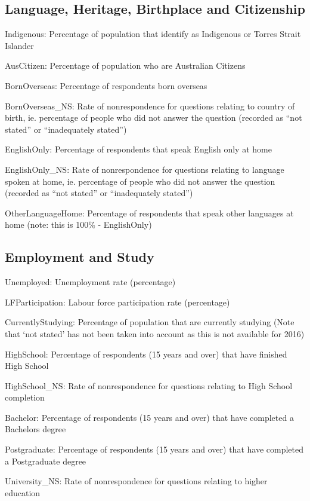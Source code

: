 \documentclass{monashthesis}
\theoremstyle{definition}
\theoremstyle{definition}
\theoremstyle{definition}
\theoremstyle{remark}
\begin{document}
\subsection{Language, Heritage, Birthplace and
Citizenship}\label{language-heritage-birthplace-and-citizenship}

Indigenous: Percentage of population that identify as Indigenous or
Torres Strait Islander

AusCitizen: Percentage of population who are Australian Citizens

BornOverseas: Percentage of respondents born overseas

BornOverseas\_NS: Rate of nonrespondence for questions relating to
country of birth, ie. percentage of people who did not answer the
question (recorded as ``not stated'' or ``inadequately stated'')

EnglishOnly: Percentage of respondents that speak English only at home

EnglishOnly\_NS: Rate of nonrespondence for questions relating to
language spoken at home, ie. percentage of people who did not answer the
question (recorded as ``not stated'' or ``inadequately stated'')

OtherLanguageHome: Percentage of respondents that speak other languages
at home (note: this is 100\% - EnglishOnly)

\subsection{Employment and Study}\label{employment-and-study}

Unemployed: Unemployment rate (percentage)

LFParticipation: Labour force participation rate (percentage)

CurrentlyStudying: Percentage of population that are currently studying
(Note that `not stated' has not been taken into account as this is not
available for 2016)

HighSchool: Percentage of respondents (15 years and over) that have
finished High School

HighSchool\_NS: Rate of nonrespondence for questions relating to High
School completion

Bachelor: Percentage of respondents (15 years and over) that have
completed a Bachelors degree

Postgraduate: Percentage of respondents (15 years and over) that have
completed a Postgraduate degree

University\_NS: Rate of nonrespondence for questions relating to higher
education
\end{document}

